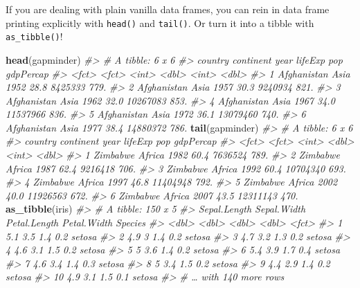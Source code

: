 \documentclass[
]{book}
\newenvironment{Shaded}{\begin{snugshade}}{\end{snugshade}}
\newcommand{\CommentTok}[1]{\textcolor[rgb]{0.56,0.35,0.01}{\textit{#1}}}
\newcommand{\KeywordTok}[1]{\textcolor[rgb]{0.13,0.29,0.53}{\textbf{#1}}}
\newcommand{\NormalTok}[1]{#1}
\begin{document}
If you are dealing with plain vanilla data frames, you can rein in data frame printing explicitly with \texttt{head()} and \texttt{tail()}. Or turn it into a tibble with \texttt{as\_tibble()}!

\begin{Shaded}
\begin{Highlighting}[]
\KeywordTok{head}\NormalTok{(gapminder)}
\CommentTok{#> # A tibble: 6 x 6}
\CommentTok{#>   country     continent  year lifeExp      pop gdpPercap}
\CommentTok{#>   <fct>       <fct>     <int>   <dbl>    <int>     <dbl>}
\CommentTok{#> 1 Afghanistan Asia       1952    28.8  8425333      779.}
\CommentTok{#> 2 Afghanistan Asia       1957    30.3  9240934      821.}
\CommentTok{#> 3 Afghanistan Asia       1962    32.0 10267083      853.}
\CommentTok{#> 4 Afghanistan Asia       1967    34.0 11537966      836.}
\CommentTok{#> 5 Afghanistan Asia       1972    36.1 13079460      740.}
\CommentTok{#> 6 Afghanistan Asia       1977    38.4 14880372      786.}
\KeywordTok{tail}\NormalTok{(gapminder)}
\CommentTok{#> # A tibble: 6 x 6}
\CommentTok{#>   country  continent  year lifeExp      pop gdpPercap}
\CommentTok{#>   <fct>    <fct>     <int>   <dbl>    <int>     <dbl>}
\CommentTok{#> 1 Zimbabwe Africa     1982    60.4  7636524      789.}
\CommentTok{#> 2 Zimbabwe Africa     1987    62.4  9216418      706.}
\CommentTok{#> 3 Zimbabwe Africa     1992    60.4 10704340      693.}
\CommentTok{#> 4 Zimbabwe Africa     1997    46.8 11404948      792.}
\CommentTok{#> 5 Zimbabwe Africa     2002    40.0 11926563      672.}
\CommentTok{#> 6 Zimbabwe Africa     2007    43.5 12311143      470.}
\KeywordTok{as_tibble}\NormalTok{(iris)}
\CommentTok{#> # A tibble: 150 x 5}
\CommentTok{#>    Sepal.Length Sepal.Width Petal.Length Petal.Width Species}
\CommentTok{#>           <dbl>       <dbl>        <dbl>       <dbl> <fct>  }
\CommentTok{#>  1          5.1         3.5          1.4         0.2 setosa }
\CommentTok{#>  2          4.9         3            1.4         0.2 setosa }
\CommentTok{#>  3          4.7         3.2          1.3         0.2 setosa }
\CommentTok{#>  4          4.6         3.1          1.5         0.2 setosa }
\CommentTok{#>  5          5           3.6          1.4         0.2 setosa }
\CommentTok{#>  6          5.4         3.9          1.7         0.4 setosa }
\CommentTok{#>  7          4.6         3.4          1.4         0.3 setosa }
\CommentTok{#>  8          5           3.4          1.5         0.2 setosa }
\CommentTok{#>  9          4.4         2.9          1.4         0.2 setosa }
\CommentTok{#> 10          4.9         3.1          1.5         0.1 setosa }
\CommentTok{#> # … with 140 more rows}
\end{Highlighting}
\end{Shaded}
\end{document}
